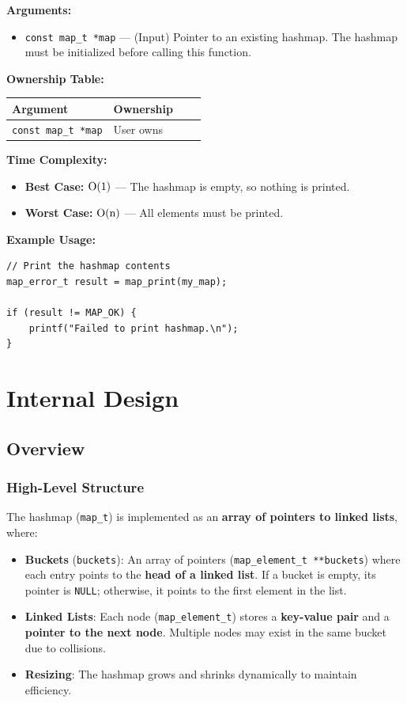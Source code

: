 \documentclass[titlepage]{article}
\begin{document}
\textbf{Arguments:}
\begin{itemize}
    \item \texttt{const map\_t *map} --- (Input) Pointer to an existing hashmap.
    The hashmap must be initialized before calling this function.
\end{itemize}

\textbf{Ownership Table:}
\begin{center}
\begin{tabular}{@{} l l c c @{} }
\toprule
\textbf{Argument} & \textbf{Ownership}  \\
\midrule
\texttt{const map\_t *map} & User owns  \\
\bottomrule
\end{tabular}
\end{center}

\textbf{Time Complexity:}
\begin{itemize}
    \item \textbf{Best Case:} \( $O(1)$ \) --- The hashmap is empty, so nothing is printed.
    \item \textbf{Worst Case:} \( $O(n)$ \) --- All elements must be printed.
\end{itemize}

\textbf{Example Usage:}
\begin{verbatim}
// Print the hashmap contents
map_error_t result = map_print(my_map);

if (result != MAP_OK) {
    printf("Failed to print hashmap.\n");
}
\end{verbatim}

\newpage
\section{Internal Design}

\subsection{Overview}

\subsubsection{High-Level Structure}
The hashmap (\texttt{map\_t}) is implemented as an \textbf{array of pointers to linked lists}, where:

\begin{itemize}
    \item \textbf{Buckets} (\texttt{buckets}): An array of pointers (\texttt{map\_element\_t **buckets}) where each entry points to the \textbf{head of a linked list}. If a bucket is empty, its pointer is \texttt{NULL}; otherwise, it points to the first element in the list.
    \item \textbf{Linked Lists}: Each node (\texttt{map\_element\_t}) stores a \textbf{key-value pair} and a \textbf{pointer to the next node}. Multiple nodes may exist in the same bucket due to collisions.
    \item \textbf{Resizing}: The hashmap grows and shrinks dynamically to maintain efficiency.
\end{itemize}
\end{document}
